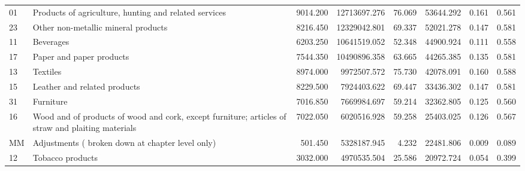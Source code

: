 \begin{tabular}{llrrrrrr}
          01 &                                                        Products of agriculture, hunting and related services &        9014.200 &     12713697.276 &      76.069 &            53644.292 &        0.161 &                 0.561 \\
          23 &                                                                          Other non-metallic mineral products &        8216.450 &     12329042.801 &      69.337 &            52021.278 &        0.147 &                 0.581 \\
          11 &                                                                                                    Beverages &        6203.250 &     10641519.052 &      52.348 &            44900.924 &        0.111 &                 0.558 \\
          17 &                                                                                     Paper and paper products &        7544.350 &     10490896.358 &      63.665 &            44265.385 &        0.135 &                 0.581 \\
          13 &                                                                                                     Textiles &        8974.000 &      9972507.572 &      75.730 &            42078.091 &        0.160 &                 0.588 \\
          15 &                                                                                 Leather and related products &        8229.500 &      7924403.622 &      69.447 &            33436.302 &        0.147 &                 0.581 \\
          31 &                                                                                                    Furniture &        7016.850 &      7669984.697 &      59.214 &            32362.805 &        0.125 &                 0.560 \\
          16 &            Wood and of products of wood and cork, except furniture; articles of straw and plaiting materials &        7022.050 &      6020516.928 &      59.258 &            25403.025 &        0.126 &                 0.567 \\
          MM &                                                             Adjustments ( broken down at chapter level only) &         501.450 &      5328187.945 &       4.232 &            22481.806 &        0.009 &                 0.089 \\
          12 &                                                                                             Tobacco products &        3032.000 &      4970535.504 &      25.586 &            20972.724 &        0.054 &                 0.399 \\

\end{tabular}
